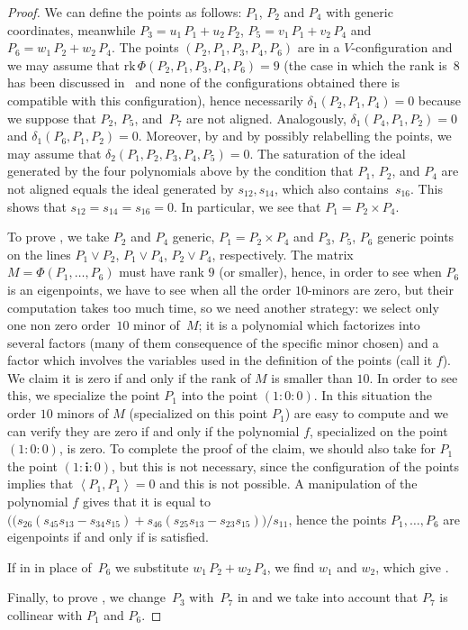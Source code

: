 \documentclass{amsart}
\theoremstyle{plain}
\theoremstyle{definition}
\newcommand{\scl}[2]{\left\langle {#1}, {#2} \right\rangle}
\newcommand{\iii}{\textbf{i}}
\newcommand{\rk}{\ensuremath{\mathrm{rk}}}
\begin{document}
\begin{proof}
We can define the points as follows: $P_1$, $P_2$ and $P_4$ with generic
coordinates, meanwhile $P_3 = u_1 \, P_1 + u_2 \, P_2$, $P_5 = v_1 \, P_1 + v_2 \, P_4$ and
$P_6 = w_1 \, P_2 + w_2 \, P_4$. The points $(P_2, P_1, P_3, P_4, P_6)$ are in a
$V$-configuration and we may assume that $\rk \, \Phi(P_2, P_1, P_3, P_4, P_6) = 9$ (the case in which the rank is~$8$ has been discussed in~ and none of the 
configurations obtained there is compatible with this configuration), hence necessarily $\delta_1(P_2, P_1, P_4)=0$ because we suppose that $P_2$, $P_5$, and~$P_7$ are not aligned.
Analogously, $\delta_1(P_4, P_1, P_2) = 0$ and $\delta_1(P_6, P_1, P_2) = 0$. Moreover, by  and by possibly relabelling the points, we may assume that $\delta_2(P_1, P_2, P_3, P_4, P_5)=0$. The saturation of the ideal generated by the four polynomials
above by the condition that $P_1$, $P_2$, and $P_4$ are not aligned equals the ideal generated by
$s_{12}, s_{14}$, which also contains~$s_{16}$. This shows that
$s_{12} = s_{14}=s_{16}=0$. In particular, we see that $P_1 = P_2 \times P_4$.

To prove , we take $P_2$ and $P_4$ generic,
$P_1 = P_2 \times P_4$ and $P_3$, $P_5$, $P_6$ generic points on the lines
$P_1 \vee P_2$, $P_1 \vee P_4$, $P_2 \vee P_4$, respectively. The matrix
$M = \Phi(P_1, \dots, P_6)$ must have rank $9$ (or smaller), hence, in order to see when $P_6$ is an eigenpoints, we have to see when all the order $10$-minors are zero, but their computation takes too much time, so we need another
strategy: we select
only one non zero order~$10$ minor of~$M$; it is a polynomial which
factorizes into
several factors (many of them consequence of the specific minor chosen) and a factor which involves the variables used in the definition
of the points (call it $f$). We claim it is zero if and only if the
rank of $M$
is smaller than $10$. In order to see this, we specialize the point $P_1$
into the point $(1:0:0)$. In this situation the order $10$ minors of $M$
(specialized on this point $P_1$) are easy to compute and we can
verify they are zero if and only if the polynomial $f$, specialized
on the point $(1:0:0)$, is zero. To complete the proof of the claim, we should
also take for $P_1$ the point $(1:\iii:0)$, but this is not necessary, since
the configuration of the points implies that $\scl{P_1}{P_1}=0$ and
this is not
possible. A manipulation of the polynomial $f$ gives that it is equal to 
$\bigl((s_{26}(s_{45}s_{13}-s_{34}s_{15})+s_{46}(s_{25}s_{13}-s_{23}s_{15})\bigr)/s_{11}$,
hence the points $P_1, \dots, P_6$ are eigenpoints if and only if  is satisfied.

If in  in place of~$P_6$ we substitute $w_1 \, P_2 + w_2 \, P_4$,
we find $w_1$ and $w_2$, which give .

Finally, to prove , we change~$P_3$ with~$P_7$ in  and we take into account that $P_7$ is collinear with $P_1$ and $P_6$.
\end{proof}
\end{document}
